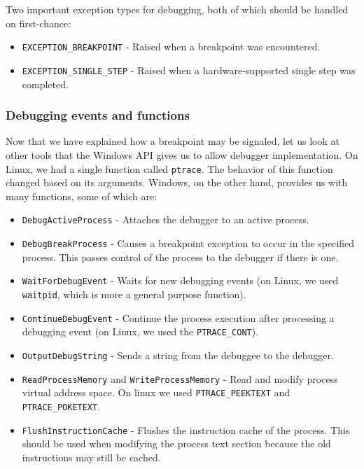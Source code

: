 Two important exception types for debugging, both of which should be handled on
first-chance:
\begin{itemize}
    \item \texttt{EXCEPTION\_BREAKPOINT} - Raised when a breakpoint was encountered.
    \item \texttt{EXCEPTION\_SINGLE\_STEP} - Raised when a hardware-supported
        single step was completed.
\end{itemize}

\subsubsection*{Debugging events and functions}
Now that we have explained how a breakpoint may be signaled, let us look at
other tools that the Windows API gives us to allow debugger implementation. On
Linux, we had a single function called \texttt{ptrace}. The behavior of this
function changed based on its arguments. Windows, on the other hand, provides
us with many functions, some of which are:

\begin{itemize}
    \item \texttt{DebugActiveProcess} - Attaches the debugger to an
        active process.
    \item \texttt{DebugBreakProcess} - Causes a breakpoint exception to
        occur in the specified process. This passes control of the process to
        the debugger if there is one.
    \item \texttt{WaitForDebugEvent} - Waits for new debugging events
        (on Linux, we used \texttt{waitpid}, which is more a general purpose
        function).
    \item \texttt{ContinueDebugEvent} - Continue the process execution
        after processing a debugging event (on Linux, we used the
        \texttt{PTRACE\_CONT}).
    \item \texttt{OutputDebugString} - Sends a string from the debuggee
        to the debugger.
    \item \texttt{ReadProcessMemory} and
    \texttt{WriteProcessMemory} - Read and modify process virtual
        address space. On linux we used \texttt{PTRACE\_PEEKTEXT} and
        \texttt{PTRACE\_POKETEXT}.
    \item \texttt{FlushInstructionCache} - Flushes the instruction cache
        of the process. This should be used when modifying the process text
        section because the old instructions may still be cached.
\end{itemize}

